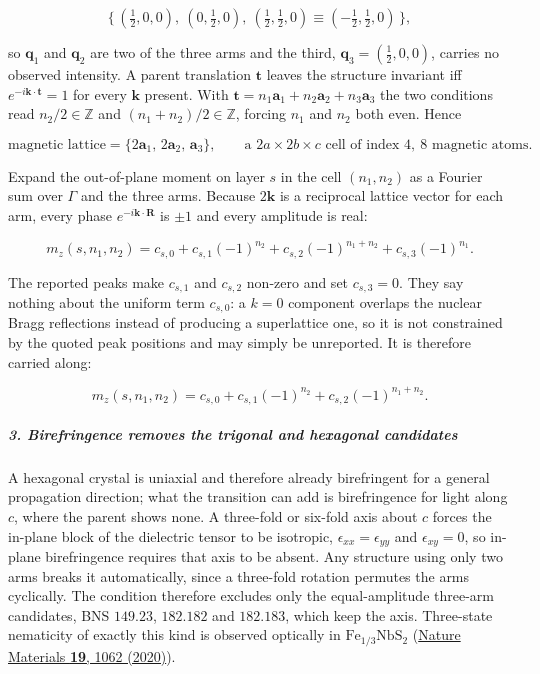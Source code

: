 \[
\{\,(\tfrac12,0,0),\ (0,\tfrac12,0),\ (\tfrac12,\tfrac12,0)\equiv(-\tfrac12,\tfrac12,0)\,\},
\]

so $\mathbf{q}_1$ and $\mathbf{q}_2$ are two of the three arms and the third, $\mathbf{q}_3=(\tfrac12,0,0)$, carries no observed intensity. A parent translation $\mathbf{t}$ leaves the structure invariant iff $e^{-i\mathbf{k}\cdot\mathbf{t}}=1$ for every $\mathbf{k}$ present. With $\mathbf{t}=n_1\mathbf{a}_1+n_2\mathbf{a}_2+n_3\mathbf{a}_3$ the two conditions read $n_2/2\in\mathbb{Z}$ and $(n_1+n_2)/2\in\mathbb{Z}$, forcing $n_1$ and $n_2$ both even. Hence

\[
{\text{magnetic lattice}=\{2\mathbf{a}_1,\,2\mathbf{a}_2,\,\mathbf{a}_3\},\qquad \text{a } 2a\times 2b\times c \text{ cell of index } 4,\ 8 \text{ magnetic atoms.}}
\]

Expand the out-of-plane moment on layer $s$ in the cell $(n_1,n_2)$ as a Fourier sum over $\Gamma$ and the three arms. Because $2\mathbf{k}$ is a reciprocal lattice vector for each arm, every phase $e^{-i\mathbf{k}\cdot\mathbf{R}}$ is $\pm1$ and every amplitude is real:

\[
m_z(s,n_1,n_2)=c_{s,0}+c_{s,1}(-1)^{n_2}+c_{s,2}(-1)^{n_1+n_2}+c_{s,3}(-1)^{n_1}.
\]

The reported peaks make $c_{s,1}$ and $c_{s,2}$ non-zero and set $c_{s,3}=0$. They say nothing about the uniform term $c_{s,0}$: a $k=0$ component overlaps the nuclear Bragg reflections instead of producing a superlattice one, so it is not constrained by the quoted peak positions and may simply be unreported. It is therefore carried along:

\[
m_z(s,n_1,n_2)=c_{s,0}+c_{s,1}(-1)^{n_2}+c_{s,2}(-1)^{n_1+n_2}.
\]

\subparagraph*{3. Birefringence removes the trigonal and hexagonal candidates}

A hexagonal crystal is uniaxial and therefore already birefringent for a general propagation direction; what the transition can add is birefringence for light along $c$, where the parent shows none. A three-fold or six-fold axis about $c$ forces the in-plane block of the dielectric tensor to be isotropic, $\epsilon_{xx}=\epsilon_{yy}$ and $\epsilon_{xy}=0$, so in-plane birefringence requires that axis to be absent. Any structure using only two arms breaks it automatically, since a three-fold rotation permutes the arms cyclically. The condition therefore excludes only the equal-amplitude three-arm candidates, BNS $149.23$, $182.182$ and $182.183$, which keep the axis. Three-state nematicity of exactly this kind is observed optically in $\mathrm{Fe_{1/3}NbS_2}$ (\href{\detokenize{https://www.nature.com/articles/s41563-020-0681-0}}{Nature Materials \textbf{19}, 1062 (2020)}).

